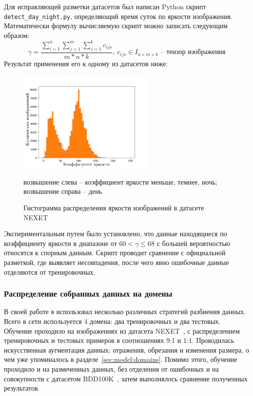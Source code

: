 \documentclass[11pt,a4paper]{extarticle}
\begin{document}
{			\noindent
			Для исправляющей разметки датасетов был написан Python скрипт \texttt{detect\_day\_night.py}, определяющий время суток по яркости изображения.
			Математически формулу вычисляемую скрипт можно записать следующим образом:
			\begin{equation}
				\gamma = \frac{\sum_{i=1}^{n}\sum_{j=1}^{m}\sum_{s=1}^{k}c_{ijs}}{m*n*k},\ c_{ijs} \in I_{n\times{m}\times{k}} \text{ -- тензор изображения}
			\end{equation} 
			Результат применения его к одному из датасетов ниже:
			\begin{figure}[ht]
				\centering
				\includegraphics[width=0.6\textwidth]{img/histogram60}
				\caption{Гистограмма распределения яркости изображений в датасете NEXET}{
					\small{
						возвышение слева -- коэффициент яркости меньше, темнее, ночь;
						возвышение справа -- день
					}
				}
				\label{pic:hist_detect}
			\end{figure}

			\noindent
			Экспериментальным путем было установлено, что данные находящиеся по коэффициенту яркости в диапазоне от \(60 < \gamma \le 68\) с большей вероятностью относятся к спорным данным.
			Скрипт проводит сравнение с официальной разметкой, где выявляет несовпадения, после чего явно ошибочные данные отделяются от тренировочных.
			
		\subsubsection*{Распределение собранных данных на домены}

			В своей работе я использовал несколько различных стратегий разбиения данных.
			Всего в сети используется 4 домена: два тренировочных и два тестовых.
			Обучение проходило на изображениях из датасета NEXET~\cite{data:nexet}, с распределением тренировочных и тестовых примеров в соотношениях 9:1 и 1:1.
			Проводилась искусственная аугментация данных: отражения, обрезания и изменения размера, о чем уже упоминалось в разделе~\ref{sec:model:domains}.
			Помимо этого, обучение проходило и на размеченных данных, без отделения от ошибочных и на совокупности с датасетом BDD100K~\cite{data:bdd100k}, затем выполнялось сравнение полученных результатов.
			
}
\end{document}
